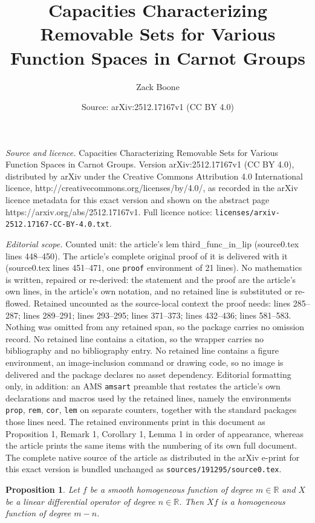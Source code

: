 \documentclass[10pt,a4paper]{amsart}
\title{Capacities Characterizing Removable Sets for Various Function Spaces in Carnot Groups}
\author{Zack Boone}
\date{Source: arXiv:2512.17167v1 (CC BY 4.0)}
\newtheorem{prop}{Proposition}
\newcommand{\R}{\mathbb{R}}
\begin{document}
\maketitle

\noindent\emph{Source and licence.} Capacities Characterizing Removable Sets for Various Function Spaces in Carnot Groups. Version arXiv:2512.17167v1 (CC BY 4.0), distributed by arXiv under the Creative Commons Attribution 4.0 International licence, http://creativecommons.org/licenses/by/4.0/, as recorded in the arXiv licence metadata for this exact version and shown on the abstract page https://arxiv.org/abs/2512.17167v1. Full licence notice: \texttt{licenses/arxiv-2512.17167-CC-BY-4.0.txt}.\par\smallskip

\noindent\textit{Editorial scope.} Counted unit: the article's lem third\_func\_in\_lip (source0.tex lines 448--450). The article's complete original proof of it is delivered with it (source0.tex lines 451--471, one \texttt{proof} environment of 21 lines). No mathematics is written, repaired or re-derived: the statement and the proof are the article's own lines, in the article's own notation, and no retained line is substituted or re-flowed.  Retained uncounted as the source-local context the proof needs: lines 285--287; lines 289--291; lines 293--295; lines 371--373; lines 432--436; lines 581--583.  Nothing was omitted from any retained span, so the package carries no omission record.  No retained line contains a citation, so the wrapper carries no bibliography and no bibliography entry.  No retained line contains a figure environment, an image-inclusion command or drawing code, so no image is delivered and the package declares no asset dependency.  Editorial formatting only, in addition: an AMS \texttt{amsart} preamble that restates the article's own declarations and macros used by the retained lines, namely the environments \texttt{prop}, \texttt{rem}, \texttt{cor}, \texttt{lem} on separate counters, together with the standard packages those lines need.  The retained environments print in this document as Proposition 1, Remark 1, Corollary 1, Lemma 1 in order of appearance, whereas the article prints the same items with the numbering of its own full document.  The complete native source of the article as distributed in the arXiv e-print for this exact version is bundled unchanged as \texttt{sources/191295/source0.tex}.
\begin{prop}\label{hom-degree-of-deriv}
Let $f$ be a smooth homogeneous function of degree $m \in \R$ and $X$ be a linear differential operator of degree $n \in \R$. Then $Xf$ is a homogeneous function of degree $m-n$.
\end{prop}
\end{document}
